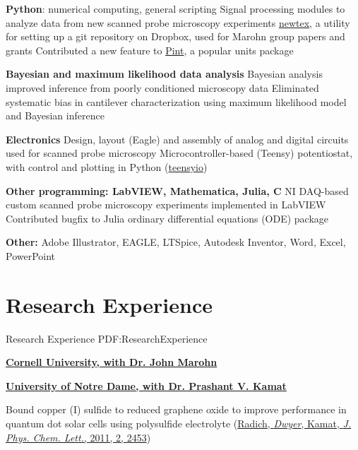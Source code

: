 \documentclass[letterpaper,MMMyyyy,nonstop]{simpleresumecv}
\begin{document}
\begin{body}


\textbf{Python}: numerical computing, general scripting
\BulletItem Signal processing modules to analyze data from new scanned probe microscopy experiments
\BulletItem \href{http://github.com/ryanpdwyer/newtex}{newtex}, a utility for setting up a git repository on Dropbox, used for Marohn group papers and grants
\BulletItem Contributed a new feature to \href{http://github.com/hgrecco/pint}{Pint}, a popular units package

\textbf{Bayesian and maximum likelihood data analysis}
\BulletItem Bayesian analysis improved inference from poorly conditioned microscopy data
\BulletItem Eliminated systematic bias in cantilever characterization using  maximum likelihood model and Bayesian inference

\textbf{Electronics}
\BulletItem Design, layout (Eagle) and assembly of analog and digital circuits used for scanned probe microscopy
\BulletItem Microcontroller-based (Teensy) potentiostat, with control and plotting in Python (\href{http://github.com/ryanpdwyer/teensyio}{teensyio})

\textbf{Other programming: LabVIEW, Mathematica, Julia, C}
\BulletItem NI DAQ-based custom scanned probe microscopy experiments implemented in LabVIEW
\BulletItem Contributed bugfix to Julia ordinary differential equations (ODE) package

\textbf{Other:} Adobe Illustrator, EAGLE, LTSpice, Autodesk Inventor, Word, Excel, PowerPoint 


\section
{Research Experience}
{Research Experience}
{PDF:ResearchExperience}

\href{http://chem.cornell.edu/marohn}
{\textbf{Cornell University, with Dr. John Marohn}}

\href{http://www3.nd.edu/~kamatlab/}{\textbf{University of Notre Dame, with Dr. Prashant V. Kamat}}

\BulletItem Bound copper (I) sulfide to reduced graphene oxide to improve performance in quantum dot solar cells using polysulfide electrolyte (\href{http://dx.doi.org/10.1021/jz201064k}{Radich, \emph{Dwyer}, Kamat, \emph{J. Phys. Chem. Lett.}, 2011, 2, 2453})




\end{body}
\end{document}
